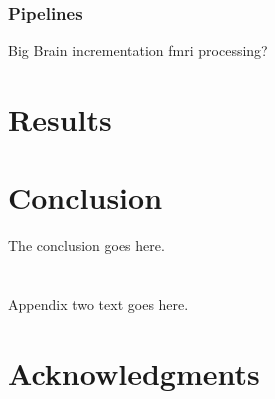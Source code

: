 \documentclass[10pt,journal,compsoc]{IEEEtran}
\begin{document}
\subsubsection{Pipelines}
Big Brain incrementation
fmri processing?

\section{Results}


\section{Conclusion}
The conclusion goes here.






%


\appendices
\section{}
Appendix two text goes here.


\ifCLASSOPTIONcompsoc
  \section*{Acknowledgments}
\else
\end{document}
